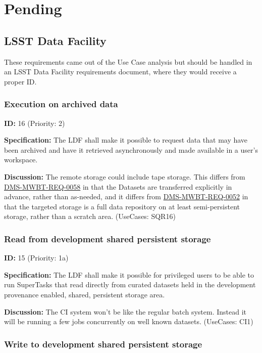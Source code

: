 \documentclass[SE,toc,lsstdraft]{lsstdoc}
\begin{document}
\section{Pending}

\subsection{LSST Data Facility}

These requirements came out of the  Use Case analysis but should be handled in an LSST Data Facility requirements document, where they would receive a proper ID.

\subsubsection{Execution on archived data}

\label{16}
\textbf{ID:} 16 (Priority: 2)

\textbf{Specification:}
The LDF shall make it possible to request data that may have been archived and have it retrieved asynchronously and made available in a user's workspace.

\textbf{Discussion:}
The remote storage could include tape storage.  This differs from \hyperref[DMS-MWBT-REQ-0058]{DMS-MWBT-REQ-0058} in that the Datasets are transferred explicitly in advance, rather than as-needed, and it differs from \hyperref[DMS-MWBT-REQ-0052]{DMS-MWBT-REQ-0052} in that the targeted storage is a full data repository on at least semi-persistent storage, rather than a scratch area. (UseCases: SQR16)

\subsubsection{Read from development shared persistent storage}

\label{15}
\textbf{ID:} 15 (Priority: 1a)

\textbf{Specification:}
The LDF shall make it possible for privileged users to be able to run SuperTasks that read directly from curated datasets held in the development provenance enabled, shared, persistent storage area.

\textbf{Discussion:}
The CI system won't be like the regular batch system.  Instead it will be running a few jobs concurrently on well known datasets. (UseCases: CI1)

\subsubsection{Write to development shared persistent storage}
\end{document}
